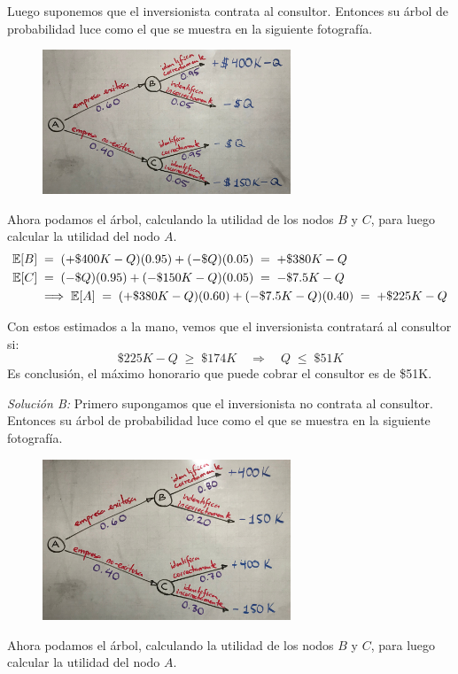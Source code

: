 \documentclass[ a4paper, twoside, 11pt]{article}
\begin{document}
\begin{problem}
Luego suponemos que el inversionista contrata al consultor. Entonces su \'arbol de probabilidad luce como el que se muestra en la siguiente fotograf\'ia. 
\begin{figure}[H]
\centering
\includegraphics[width=0.66\textwidth]{Problema-3A2.jpg}
\end{figure}
Ahora podamos el \'arbol, calculando la utilidad de los nodos $B$ y $C$, para luego calcular la utilidad del nodo $A$. 
\begin{align*}
\mathbb{E}[B] \; 
& = \; (+\$400K-Q)(0.95) + (-\$Q)(0.05) \; = \; +\$380K - Q \\
\mathbb{E}[C] \; 
& = \; (-\$Q)(0.95) + (-\$150K - Q)(0.05) \; = \; -\$7.5K - Q \\
& \Longrightarrow \; \mathbb{E}[A] \; = \;
(+\$380K - Q)(0.60) + (-\$7.5K - Q)(0.40) \; = \; +\$225K - Q
\end{align*}

Con estos estimados a la mano, vemos que el inversionista contratar\'a al consultor si: 
\[
\$225K - Q \; \geq \; \$174K \quad \Longrightarrow \quad
Q \; \leq \; \$51K
\]
Es conclusi\'on, el m\'aximo honorario que puede cobrar el consultor es de \$51K. 
\QED

\emph{Soluci\'on B:} Primero supongamos que el inversionista no contrata al consultor. Entonces su \'arbol de probabilidad luce como el que se muestra en la siguiente fotograf\'ia. 
\begin{figure}[H]
\centering
\includegraphics[width=0.66\textwidth]{Problema-3B1.jpg}
\end{figure}
Ahora podamos el \'arbol, calculando la utilidad de los nodos $B$ y $C$, para luego calcular la utilidad del nodo $A$. 


\end{problem}
\end{document}
